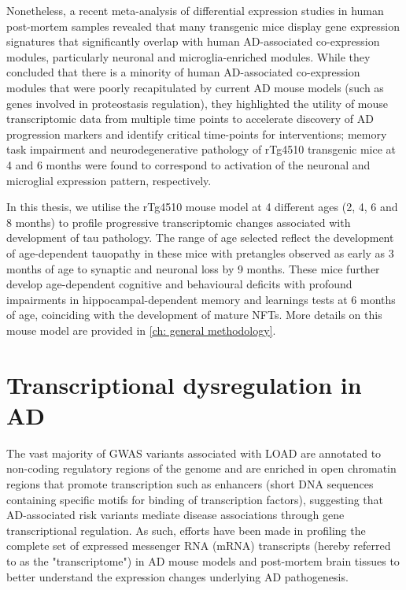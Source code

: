 Nonetheless, a recent meta-analysis of differential expression studies in human post-mortem samples revealed that many transgenic mice display gene expression signatures that significantly overlap with human AD-associated co-expression modules, particularly neuronal and microglia-enriched modules\cite{Wan2020}. While they concluded that there is a minority of human AD-associated co-expression modules that were poorly recapitulated by current AD mouse models (such as genes involved in proteostasis regulation), they highlighted the utility of mouse transcriptomic data from multiple time points to accelerate discovery of AD progression markers and identify critical time-points for interventions; memory task impairment and neurodegenerative pathology of rTg4510 transgenic mice at 4 and 6 months were found to correspond to activation of the neuronal and microglial expression pattern, respectively. 

In this thesis, we utilise the rTg4510 mouse model at 4 different ages (2, 4, 6 and 8 months) to profile progressive transcriptomic changes associated with development of tau pathology. The range of age selected reflect the development of age-dependent tauopathy in these mice with pretangles observed as early as 3 months of age to synaptic and neuronal loss by 9 months. These mice further develop age-dependent cognitive and behavioural deficits with profound impairments in hippocampal-dependent memory and learnings tests at 6 months of age, coinciding with the development of mature NFTs. More details on this mouse model are provided in \cref{ch: general methodology}. 


\clearpage
\section{Transcriptional dysregulation in AD}

The vast majority of GWAS variants associated with LOAD are annotated to non-coding regulatory regions of the genome and are enriched in open chromatin regions that promote transcription such as enhancers\cite{Kikuchi2019} (short DNA sequences containing specific motifs for binding of transcription factors), suggesting that AD-associated risk variants mediate disease associations through gene transcriptional regulation. As such, efforts have been made in profiling the complete set of expressed messenger RNA (mRNA) transcripts (hereby referred to as the "transcriptome") in AD mouse models and post-mortem brain tissues to better understand the expression changes underlying AD pathogenesis. 

